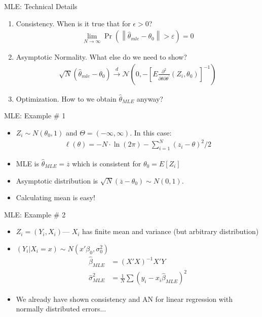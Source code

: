 \documentclass[aspectratio=169]{beamer}
\begin{document}
\begin{frame}{MLE: Technical Details}
\begin{enumerate}
\item Consistency. When is it true that for $\epsilon>0$?
\begin{align*}
\lim _ { N \rightarrow \infty } \operatorname { Pr } \left( \left\| \hat { \theta } _ { m l e } - \theta _ { 0 } \right\| > \varepsilon \right) = 0
\end{align*}
\item Asymptotic Normality. What else do we need to show?
\begin{align*}
\sqrt { N } \left( \hat { \theta } _ { m l e } - \theta _ { 0 } \right) \stackrel { d } { \longrightarrow } \mathcal { N } \left( 0 , - \left[ E \frac { \partial ^ { 2 } } { \partial \theta \partial \theta ^ { \prime } } \left( Z _ { i } , \theta _ { 0 } \right) \right] ^ { - 1 } \right)
\end{align*}
\item Optimization. How to we obtain $\widehat{\theta}_{MLE}$ anyway?
\end{enumerate}
\end{frame}


\begin{frame}{MLE: Example \# 1}
\begin{itemize}
\item $Z_i \sim N(\theta_0,1)$ and $\Theta = (-\infty,\infty)$. In this case:
\begin{align*}
\ell ( \theta ) = - N \cdot \ln ( 2 \pi ) - \sum _ { i = 1 } ^ { N } \left( z _ { i } - \theta \right) ^ { 2 } / 2
\end{align*}
\item MLE is $\widehat{\theta}_{MLE}=\overline{z}$ which is consistent for $\theta_0 = E[Z_i]$
\item Asymptotic distribution is $\sqrt{N} ( \overline{z}-\theta_0) \sim N(0,1)$.
\item Calculating mean is easy!
\end{itemize}
\end{frame}




\begin{frame}{MLE: Example \# 2}
\begin{itemize}
\item $Z_i = (Y_i, X_i)$---   $X_i$ has finite mean and variance (but arbitrary distribution)
\item $(Y_i | X_i  =x) \sim N(x' \beta_0, \sigma_0^2)$
\begin{align*}
\widehat{\beta}_{MLE} &= (X'X)^{-1} X'Y\\
\widehat{\sigma}^2_{MLE} &= \frac{1}{N} \sum (y_i - x_i \widehat{\beta}_{MLE})^2
\end{align*}
\item We already have shown consistency and AN for linear regression with normally distributed errors...
\end{itemize}
\end{frame}
\end{document}
